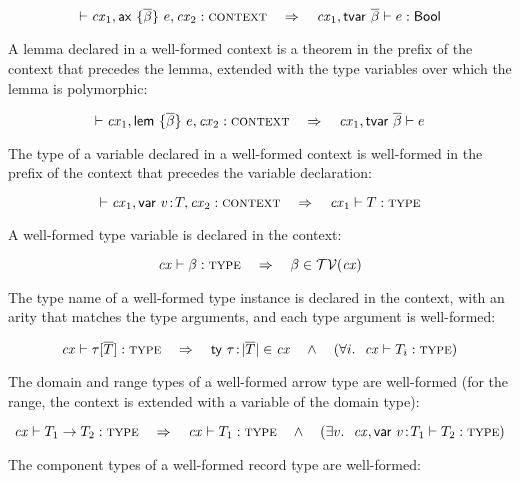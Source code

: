 \begin{theorem}\label{thm-ax-wt}
\[
\vdash\mathit{cx}_1,\mathsf{ax}\ \{\overline{\beta}\}\ e,\mathit{cx}_2:\textsc{context}\ \ \ \Rightarrow\ \ \
\mathit{cx}_1,\mathsf{tvar}\ \overline{\beta}\vdash e:\mathsf{Bool}
\]
\end{theorem}

A lemma declared in a well-formed context is a theorem in the prefix of the
context that precedes the lemma, extended with the type variables over which
the lemma is polymorphic:

\begin{theorem}\label{thm-lem-theo}
\[
\vdash\mathit{cx}_1,\mathsf{lem}\ \{\overline{\beta}\}\ e,\mathit{cx}_2:\textsc{context}\ \ \ \Rightarrow\ \ \
\mathit{cx}_1,\mathsf{tvar}\ \overline{\beta}\vdash e
\]
\end{theorem}

The type of a variable declared in a well-formed context is well-formed in the
prefix of the context that precedes the variable declaration:

\begin{theorem}\label{thm-var-type-wf}
\[
\cxwf{\cx_1,\vdecO,\cx_2}\ \ \IMPLIES\ \ \isty{\cx_1}{\typ}
\]
\end{theorem}

A well-formed type variable is declared in the context:

\begin{theorem}\label{thm-tvar-inv}
\[
\istyO{\tvar}\ \ \IMPLIES\ \ \tvar\in\cxtvarO
\]
\end{theorem}

The type name of a well-formed type instance is declared in the context, with
an arity that matches the type arguments, and each type argument is
well-formed:

\begin{theorem}\label{thm-tinst-inv}
\[
\mathit{cx}\vdash\tau[\overline{T}]:\textsc{type}
\ \ \ \Rightarrow\ \ \
\mathsf{ty}\ \tau\!:\!|\overline{T}|\in\mathit{cx}
\ \ \ \wedge\ \ \
(\forall i.\ \ \mathit{cx}\vdash T_i:\textsc{type})
\]
\end{theorem}

The domain and range types of a well-formed arrow type are well-formed (for
the range, the context is extended with a variable of the domain type):

\begin{theorem}\label{thm-tarr-inv}
\[
\mathit{cx}\vdash T_1\to T_2:\textsc{type}\ \ \ \Rightarrow\ \ \
\mathit{cx}\vdash T_1:\textsc{type}\ \ \ \wedge\ \ \
(\exists v.\ \ \mathit{cx},\mathsf{var}\ v\!:\!T_1\vdash T_2:\textsc{type})
\]
\end{theorem}

The component types of a well-formed record type are well-formed:


